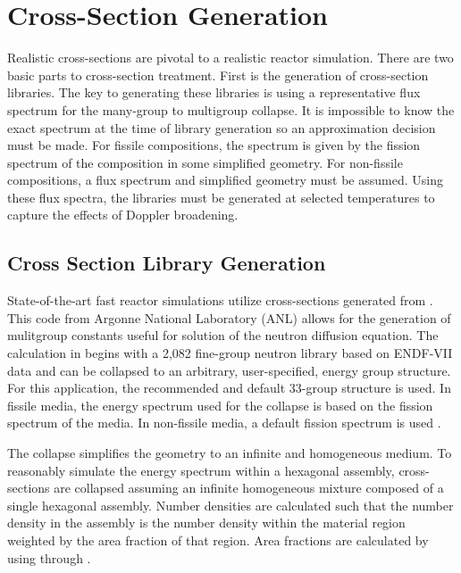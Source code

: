 \section{Cross-Section Generation}
  Realistic cross-sections are pivotal to a realistic reactor simulation. There
  are two basic parts to cross-section treatment. First is the generation of
  cross-section libraries. The key to generating these libraries is using a
  representative flux spectrum for the many-group to multigroup collapse. It is
  impossible to know the exact spectrum at the time of library generation so an
  approximation decision must be made.
  For fissile compositions, the spectrum is given by the
  fission spectrum of the composition in some simplified geometry. For 
  non-fissile compositions, a flux spectrum and simplified geometry must be 
  assumed.  Using these flux spectra, the libraries must be generated at 
  selected temperatures to capture the effects of Doppler broadening.

  \subsection{Cross Section Library Generation}
    State-of-the-art fast reactor simulations utilize cross-sections generated
    from \mcc. This code from Argonne National Laboratory (ANL) allows for the
    generation of mulitgroup constants useful for solution of the neutron
    diffusion equation. The calculation in \mcc begins with a 2,082 fine-group
    neutron library based on ENDF-VII data and can be collapsed to an
    arbitrary, user-specified, energy group structure. For this application, the
    recommended and default 33-group structure is used. In fissile media, the
    energy spectrum used for the collapse is based on the fission spectrum of
    the media. In non-fissile media, a default  fission spectrum
    is used \cite{mcc}.
    
    The collapse simplifies the geometry to an infinite and homogeneous medium.
    To reasonably simulate the energy spectrum within a hexagonal assembly,
    cross-sections are collapsed assuming an infinite homogeneous mixture 
    composed of a single hexagonal assembly. Number densities are calculated 
    such that the number density in the assembly is the number density within
    the material region weighted by the area fraction of that region. Area
    fractions are calculated by using  through 
    .
    
